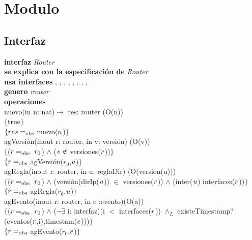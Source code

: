 \section*{Modulo }

\subsection*{Interfaz}
\textbf{interfaz} \textit{Router}\\
\textbf{se explica con la especificaci\'on de} \textit{Router}\\
\textbf{usa interfaces} , , , , , , , , \\
\textbf{genero} \textit{router}\\

\textbf{operaciones}\\

nuevo(in n: nat)$\rightarrow$ res: router  \hfill(O(n)) \\
$\{$true$\}$\\
$\{{res} =_{\mathrm{obs}}$ nuevo(${n}$)$\}$\\

agVersi\'on(inout r: router, in v: versi\'on) \hfill(O(v))\\
$\{$(${r} =_{\mathrm{obs}}\ r_0$) $\wedge$ (${v} \notin$ versiones(${r}$))$\}$\\
$\{{r} =_{\mathrm{obs}}$ agVersi\'on($r_0$,${v}$)$\}$\\

agRegla(inout r: router, in u: reglaDir) \hfill(O(version(u))) \\
$\{$(${r} =_{\mathrm{obs}}\ r_0$) $\wedge$ (versi\'on(dirIp(${u}$)) $\in$ versiones(${r}$)) $\wedge$ (inter(${u}$) interfaces(${r}$))$\}$\\
$\{{r} =_{\mathrm{obs}}$ agRegla($r_0$,${u}$)$\}$\\

agEvento(inout r: router, in e :evento)\hfill(O(a)) \\
$\{$(${r} =_{\mathrm{obs}}\ r_0$) $\wedge$ ($\neg \exists$ i: interfaz)(i $<$ interfaces(${r}$)) $\wedge_L$ existeTimestamp?(eventos(${r}$,i),timestam(${e}$)))$\}$\\
$\{{r}=_{\mathrm{obs}}$ agEvento($r_0$,${e}$)$\}$\\

